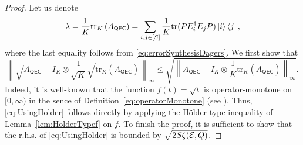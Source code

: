 \documentclass[10pt]{article}
\newcommand{\tr}{\mathrm{tr}}
\newcommand{\p}[1]{\left(#1\right)}
\newcommand{\norm}[1]{\left\|#1\right\|}
\newcommand{\s}[1]{\mathsf{#1}}
\begin{document}
\begin{proof}
    Let us denote 
    \[\lambda=\frac{1}{K} \tr_K\p{A_{\s{QEC}}}=\sum_{i,j\in [S]}\frac{1}{K}\tr(PE_i^\dag E_jP) \ket{i}\bra{j},\]
    where the last equality follows from \eqref{eq:errorSynthesisDagers}. We first show that 
    \begin{equation}
        \norm{\sqrt{A_{\s{QEC}}}-I_{K}\otimes \frac{1}{\sqrt{K}}\sqrt{\tr_K(A_{\s{QEC}})}}_{\infty}\leq \sqrt{\norm{A_{\s{QEC}}-I_{K}\otimes \frac{1}{K}\tr_K(A_{\s{QEC}})}_{\infty}}.\label{eq:UsingHolder}
    \end{equation}
    Indeed, it is well-known that the function $f(t)=\sqrt{t}$ is operator-monotone on $[0,\infty)$ in the sence of Definition~\ref{eq:operatorMonotone} (see  \cite[Proposition V.1.8]{bhatia2013matrix}). Thus, \eqref{eq:UsingHolder}  follows directly by applying the  H\"older type inequality of Lemma~\ref{lem:HolderTypef} on $f$. To finish the proof, it is sufficient to show that the r.h.s. of \eqref{eq:UsingHolder} is bounded by $ {\sqrt{2S\zeta({\cal E},Q)}}$. 


\end{proof}
\end{document}
